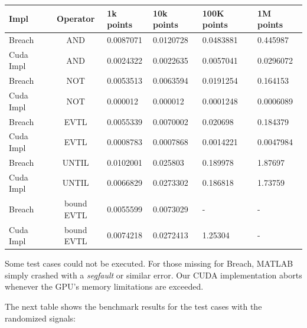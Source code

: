 \documentclass[a4paper,10pt]{article}
\begin{document}
\begin{center}
	\begin{tabular}{| l | c || l | l | l | l |}
	    \hline
	    Impl & Operator & 1k points & 10k points & 100K points & 1M points \\
	    \hline \hline
	    Breach & AND & 0.0087071 & 0.0120728 & 0.0483881 & 0.445987 \\
	    Cuda Impl & AND & 0.0024322 & 0.0022635 & 0.0057041 & 0.0296072 \\
	    \hline \hline   
	    Breach & NOT & 0.0053513 & 0.0063594 & 0.0191254 & 0.164153 \\
	    Cuda Impl & NOT & 0.000012 & 0.000012 & 0.0001248 & 0.0006089 \\
	    \hline \hline   
        Breach & EVTL & 0.0055339 & 0.0070002 & 0.020698 & 0.184379 \\
        Cuda Impl & EVTL & 0.0008783 & 0.0007868 & 0.0014221 & 0.0047984 \\
	    \hline \hline   
        Breach & UNTIL & 0.0102001 & 0.025803 & 0.189978 & 1.87697 \\
        Cuda Impl & UNTIL & 0.0066829 & 0.0273302 & 0.186818 & 1.73759 \\        
	    \hline \hline   
        Breach & bound EVTL & 0.0055599 & 0.0073029 & - & - \\
        Cuda Impl & bound EVTL & 0.0074218 & 0.0272413 & 1.25304 & - \\        
	    \hline
	\end{tabular}
	\label{tab: bechmark results signal type1}
\end{center}

Some test cases could not be executed. For those missing for Breach, MATLAB simply crashed with a
{\it segfault} or similar error. Our CUDA implementation aborts whenever the GPU's memory
limitations are exceeded.

The next table shows the benchmark results for the test cases with the randomized signals:
\end{document}
